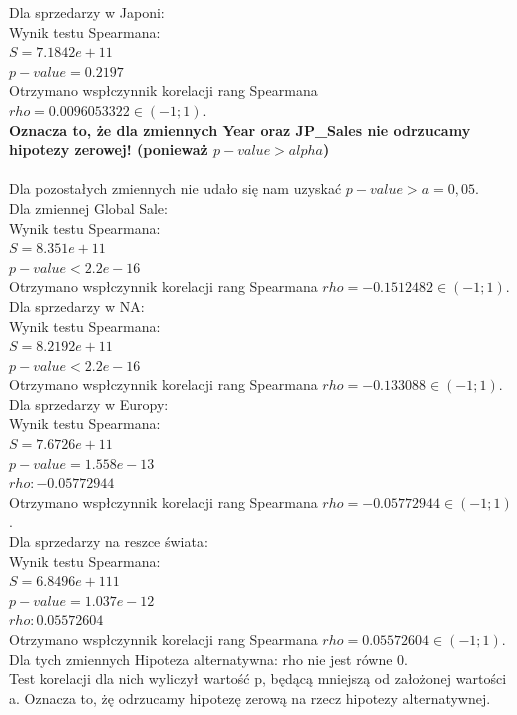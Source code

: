 \documentclass[12pt]{article}
\begin{document}
	Dla sprzedarzy w Japoni:\\
	Wynik testu Spearmana:\\
	\(S=7.1842e+11\)\\
	\(p-value =0.2197\)\\
	Otrzymano wspłczynnik korelacji rang Spearmana \(rho= 0.0096053322 \in (-1;1)\).\\
{\color{red}\textbf{Oznacza to, że dla zmiennych Year oraz JP\_Sales nie odrzucamy hipotezy zerowej! (ponieważ \(p-value>alpha\))} }
\\
\\
	Dla pozostałych zmiennych nie udało się nam uzyskać \(p-value > a=0,05\).\\
	Dla zmiennej Global Sale:\\
	Wynik testu Spearmana:\\
	\(S=8.351e+11\)\\
	\(p-value < 2.2e-16\)\\
	Otrzymano wspłczynnik korelacji rang Spearmana \(rho=-0.1512482 \in (-1;1)\).\\
	Dla sprzedarzy w NA:\\
	Wynik testu Spearmana:\\
	\(S= 8.2192e+11\)\\
	\(p-value < 2.2e-16\)\\
	Otrzymano wspłczynnik korelacji rang Spearmana \(rho= -0.133088  \in (-1;1)\).\\
	Dla sprzedarzy w Europy:\\
	Wynik testu Spearmana:\\
	\(S=7.6726e+11\)\\
	\(p-value = 1.558e-13\)\\
	\(rho: -0.05772944   \)\\
	Otrzymano wspłczynnik korelacji rang Spearmana \(rho= -0.05772944   \in (-1;1)\).\\
	Dla sprzedarzy na reszce świata:\\
	Wynik testu Spearmana:\\
	\(S=6.8496e+111\)\\
	\(p-value =  1.037e-12\)\\	
	\(rho: 0.05572604   \)\\
	Otrzymano wspłczynnik korelacji rang Spearmana \(rho= 0.05572604   \in (-1;1)\).\\

Dla tych zmiennych Hipoteza alternatywna: rho nie jest równe 0.\\
	Test korelacji dla nich wyliczył wartość p, będącą mniejszą od założonej wartości a. Oznacza to, żę odrzucamy hipotezę zerową na rzecz hipotezy alternatywnej.
\end{document}
